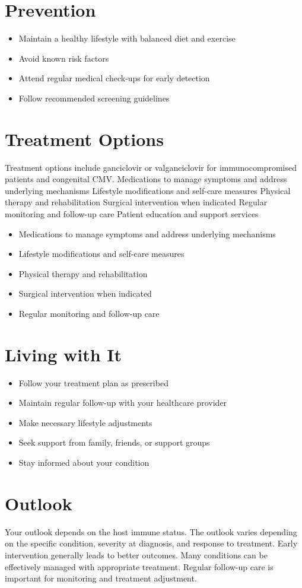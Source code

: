 \section{Prevention}
\begin{itemize}[noitemsep]
  \item Maintain a healthy lifestyle with balanced diet and exercise
  \item Avoid known risk factors
  \item Attend regular medical check-ups for early detection
  \item Follow recommended screening guidelines
\end{itemize}
\section{Treatment Options}
Treatment options include ganciclovir or valganciclovir for immunocompromised patients and congenital CMV. Medications to manage symptoms and address underlying mechanisms Lifestyle modifications and self-care measures Physical therapy and rehabilitation Surgical intervention when indicated Regular monitoring and follow-up care Patient education and support services

\begin{itemize}[noitemsep]
  \item Medications to manage symptoms and address underlying mechanisms
  \item Lifestyle modifications and self-care measures
  \item Physical therapy and rehabilitation
  \item Surgical intervention when indicated
  \item Regular monitoring and follow-up care
\end{itemize}
\section{Living with It}
\begin{itemize}[noitemsep]
  \item Follow your treatment plan as prescribed
  \item Maintain regular follow-up with your healthcare provider
  \item Make necessary lifestyle adjustments
  \item Seek support from family, friends, or support groups
  \item Stay informed about your condition
\end{itemize}
\section{Outlook}
Your outlook depends on the host immune status. The outlook varies depending on the specific condition, severity at diagnosis, and response to treatment. Early intervention generally leads to better outcomes. Many conditions can be effectively managed with appropriate treatment. Regular follow-up care is important for monitoring and treatment adjustment.
